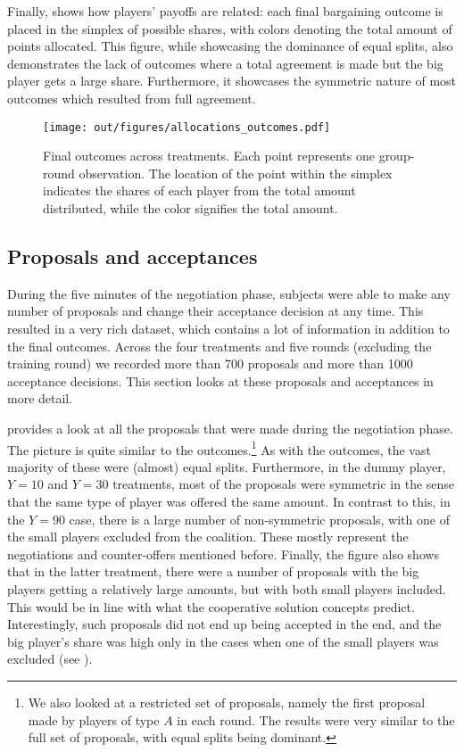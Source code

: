 Finally,  shows how players' payoffs are related: each final bargaining outcome is placed in the simplex of possible shares, with colors denoting the total amount of points allocated. This figure, while showcasing the dominance of equal splits, also demonstrates the lack of outcomes where a total agreement is made but the big player gets a large share. Furthermore, it showcases the symmetric nature of most outcomes which resulted from full agreement.

\begin{figure}
    \centering
    \texttt{[image: out/figures/allocations\_outcomes.pdf]}
    \caption{Final outcomes across treatments. Each point represents one group-round observation. The location of the point within the simplex indicates the shares of each player from the total amount distributed, while the color signifies the total amount.}
    \label{fig:allocations_outcomes}
\end{figure}


\subsection{Proposals and acceptances}

During the five minutes of the negotiation phase, subjects were able to make any number of proposals and change their acceptance decision at any time. This resulted in a very rich dataset, which contains a lot of information in addition to the final outcomes. Across the four treatments and five rounds (excluding the training round) we recorded more than 700 proposals and more than 1000 acceptance decisions. This section looks at these proposals and acceptances in more detail.

 provides a look at all the proposals that were made during the negotiation phase. The picture is quite similar to the outcomes.\footnote{
    We also looked at a restricted set of proposals, namely the first proposal made by players of type $A$ in each round.
    The results were very similar to the full set of proposals, with equal splits being dominant.
}
As with the outcomes, the vast majority of these were (almost) equal splits. Furthermore, in the dummy player, $Y=10$ and $Y=30$ treatments, most of the proposals were symmetric in the sense that the same type of player was offered the same amount. In contrast to this, in the $Y=90$ case, there is a large number of non-symmetric proposals, with one of the small players excluded from the coalition. These mostly represent the negotiations and counter-offers mentioned before. Finally, the figure also shows that in the latter treatment, there were a number of proposals with the big players getting a relatively large amounts, but with both small players included. This would be in line with what the cooperative solution concepts predict. Interestingly, such proposals did not end up being accepted in the end, and the big player's share was high only in the cases when one of the small players was excluded (see ).

